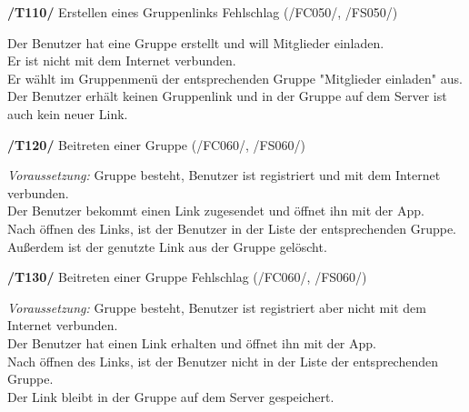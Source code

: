 \textbf{/T110/} Erstellen eines Gruppenlinks Fehlschlag (/FC050/, /FS050/)\\
\begin{center}
\vspace{-\parskip}
\begin{minipage}[t]{0.9\textwidth}
Der Benutzer hat eine Gruppe erstellt und will Mitglieder einladen.            \\
Er ist nicht mit dem Internet verbunden.                                        \\
Er wählt im Gruppenmenü der entsprechenden Gruppe "Mitglieder einladen" aus.     \\
Der Benutzer erhält keinen Gruppenlink und in der Gruppe auf dem Server ist auch kein neuer Link.\\
\end{minipage}
\end{center}

\textbf{/T120/} Beitreten einer Gruppe (/FC060/, /FS060/)\\
\begin{center}
\vspace{-\parskip}
\begin{minipage}[t]{0.9\textwidth}
\emph{Voraussetzung:} Gruppe besteht, Benutzer ist registriert und mit dem Internet verbunden. \\
Der Benutzer bekommt einen Link zugesendet und öffnet ihn mit der App.                   \\
Nach öffnen des Links, ist der Benutzer in der Liste der entsprechenden Gruppe.           \\
Außerdem ist der genutzte Link aus der Gruppe gelöscht.                                    \\
\end{minipage}
\end{center}

\textbf{/T130/} Beitreten einer Gruppe Fehlschlag (/FC060/, /FS060/)\\
\begin{center}
\vspace{-\parskip}
\begin{minipage}[t]{0.9\textwidth}
\emph{Voraussetzung:} Gruppe besteht, Benutzer ist registriert aber nicht mit dem Internet verbunden.\\
Der Benutzer hat einen Link erhalten und öffnet ihn mit der App.                               \\
Nach öffnen des Links, ist der Benutzer nicht in der Liste der entsprechenden Gruppe.           \\
Der Link bleibt in der Gruppe auf dem Server gespeichert.                                        \\
\end{minipage}
\end{center}

